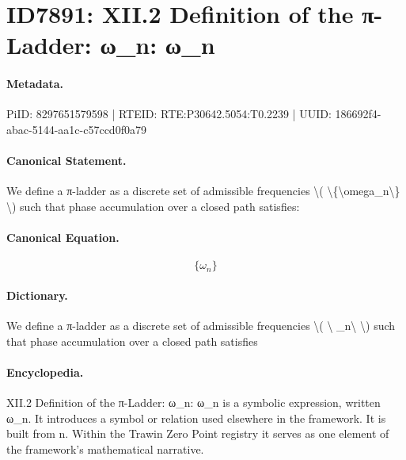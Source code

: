 \section*{ID7891: XII.2 Definition of the π-Ladder: ω\_n: ω\_n}
\paragraph{Metadata.}
PiID: 8297651579598 | RTEID: RTE:P30642.5054:T0.2239 | UUID: 186692f4-abac-5144-aa1c-c57ccd0f0a79

\paragraph{Canonical Statement.}
We define a π-ladder as a discrete set of admissible frequencies \textbackslash{}( \textbackslash{}\{\textbackslash{}omega\_n\textbackslash{}\} \textbackslash{}) such that phase accumulation over a closed path satisfies:

\paragraph{Canonical Equation.}
\[
\{\omega_n\}
\]

\paragraph{Dictionary.}
We define a π-ladder as a discrete set of admissible frequencies \textbackslash{}( \textbackslash{} \_n\textbackslash{} \textbackslash{}) such that phase accumulation over a closed path satisfies

\paragraph{Encyclopedia.}
XII.2 Definition of the π-Ladder: ω\_n: ω\_n is a symbolic expression, written ω\_n. It introduces a symbol or relation used elsewhere in the framework. It is built from n. Within the Trawin Zero Point registry it serves as one element of the framework's mathematical narrative.
